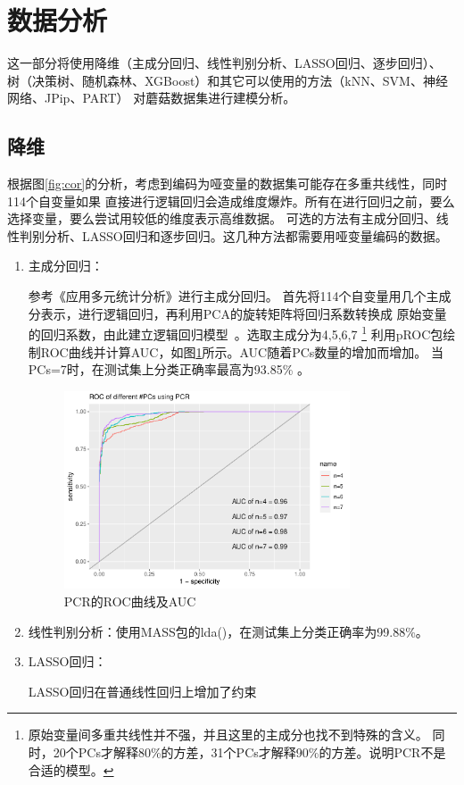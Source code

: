 \documentclass[lang=cn,11pt,a4paper,cite=super]{elegantpaper}
\begin{document}
\section{数据分析}
这一部分将使用降维（主成分回归、线性判别分析、LASSO回归、逐步回归）、
树（决策树、随机森林、XGBoost）和其它可以使用的方法（kNN、SVM、神经网络、JPip、PART）
对蘑菇数据集进行建模分析。
\subsection{降维}
根据图\ref{fig:cor}的分析，考虑到编码为哑变量的数据集可能存在多重共线性，同时114个自变量如果
直接进行逻辑回归会造成维度爆炸。所有在进行回归之前，要么选择变量，要么尝试用较低的维度表示高维数据。
可选的方法有主成分回归、线性判别分析、LASSO回归和逐步回归。这几种方法都需要用哑变量编码的数据。
\begin{enumerate}
   \item 主成分回归：\par 参考《应用多元统计分析》进行主成分回归。
   首先将114个自变量用几个主成分表示，进行逻辑回归，再利用PCA的旋转矩阵将回归系数转换成
   原始变量的回归系数，由此建立逻辑回归模型~\cite{ghx}。选取主成分为4,5,6,7
   \footnote{原始变量间多重共线性并不强，并且这里的主成分也找不到特殊的含义。
   同时，20个PCs才解释80\%的方差，31个PCs才解释90\%的方差。说明PCR不是合适的模型。}
   利用pROC包绘制ROC曲线并计算AUC，如图\ref{fig:pcrroc}所示。AUC随着PCs数量的增加而增加。
   当PCs=7时，在测试集上分类正确率最高为93.85\% 。
   \begin{figure}[htb]
      \centering
      \includegraphics[width=0.8\textwidth]{img/pcr.roc-1.pdf}
      \caption{PCR的ROC曲线及AUC}
      \label{fig:pcrroc}
   \end{figure}
   \item 线性判别分析：使用MASS包的lda()，在测试集上分类正确率为99.88\%。
   \item LASSO回归：\par LASSO回归在普通线性回归上增加了约束

\end{enumerate}
\end{document}
